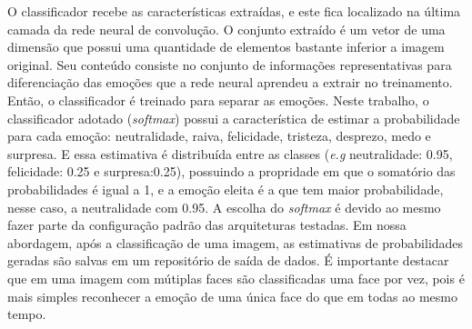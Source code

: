 O classificador recebe as características extraídas, e este fica localizado na última camada da rede neural de convolução. O conjunto extraído é um vetor de uma dimensão que possui uma quantidade de elementos bastante inferior a imagem original. Seu conteúdo consiste no conjunto de informações representativas para diferenciação das emoções que a rede neural aprendeu a extrair no treinamento. Então, o classificador é treinado para separar as emoções. Neste trabalho, o classificador adotado (\textit{softmax}) possui a característica de estimar a probabilidade para cada emoção: neutralidade, raiva, felicidade, tristeza, desprezo, medo e surpresa. E essa estimativa é distribuída entre as classes (\textit{e.g} neutralidade: 0.95, felicidade: 0.25 e surpresa:0.25), possuindo a propridade em que o somatório das probabilidades é igual a 1, e a emoção eleita é a que tem maior probabilidade, nesse caso, a neutralidade com 0.95. A escolha do \textit{softmax} é devido ao mesmo fazer parte da configuração padrão das arquiteturas testadas. Em nossa abordagem, após a classificação de uma imagem, as estimativas de probabilidades geradas são salvas em um repositório de saída de dados. É importante destacar que em uma imagem com mútiplas faces são classificadas uma face por vez, pois é mais simples reconhecer a emoção de uma única face do que em todas ao mesmo tempo.   


